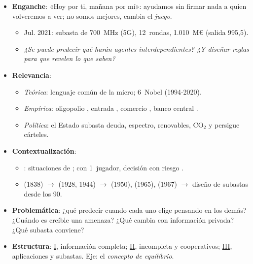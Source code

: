 \documentclass{article}
\begin{document}
\cabecerarepaso
\begin{columnas}

\begin{itemize}
\item \textbf{Enganche}: «Hoy por ti, mañana por mí»: ayudamos sin firmar nada a quien volveremos a ver; no somos mejores, cambia el \emph{juego}.
  \begin{itemize}
  \item Jul. 2021: subasta de 700~MHz (5G), 12~rondas, 1.010~M€ (salida 995,5).
  \item \emph{¿Se puede predecir qué harán agentes interdependientes? ¿Y diseñar reglas para que revelen lo que saben?}
  \end{itemize}
\item \textbf{Relevancia}:
  \begin{itemize}
  \item \emph{Teórica}: lenguaje común de la micro; 6~Nobel (1994-2020).
  \item \emph{Empírica}: oligopolio , entrada , comercio , banco central .
  \item \emph{Política}: el Estado subasta deuda, espectro, renovables, CO$_2$ y persigue cárteles.
  \end{itemize}
\item \textbf{Contextualización}:
  \begin{itemize}
  \item {}: situaciones de ; con 1~jugador, decisión con riesgo .
  \item {} (1838) $\to$  (1928, 1944) $\to$  (1950),  (1965),  (1967) $\to$ diseño de subastas desde los 90.
  \end{itemize}
\item \textbf{Problemática}: ¿qué predecir cuando cada uno elige pensando en los demás? ¿Cuándo es creíble una amenaza? ¿Qué cambia con información privada? ¿Qué subasta conviene?
\item \textbf{Estructura}: \hyperref[rep:I]{I}, información completa; \hyperref[rep:II]{II}, incompleta y cooperativos; \hyperref[rep:III]{III}, aplicaciones y subastas. Eje: el \emph{concepto de equilibrio}.
\end{itemize}
\esquemacante{%
}
\end{columnas}
\end{document}
